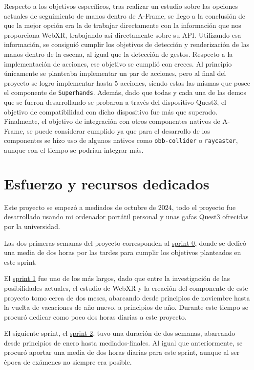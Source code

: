 \documentclass[a4paper, 12pt]{book}
\begin{document}
Respecto a los objetivos específicos, tras realizar un estudio sobre las opciones actuales de seguimiento de manos dentro de A-Frame, se llego a la conclusión de que la mejor opción era la de trabajar directamente con la información que nos proporciona WebXR, trabajando así directamente sobre su API. 
Utilizando esa información, se consiguió cumplir los objetivos de detección y renderización de las manos dentro de la escena, al igual que la detección de gestos. 
Respecto a la implementación de acciones, ese objetivo se cumplió con creces. Al principio únicamente se planteaba implementar un par de acciones, pero al final del proyecto se logro implementar hasta 5 acciones, siendo estas las mismas que posee el componente de \texttt{Superhands}.
Además, dado que todas y cada una de las demos que se fueron desarrollando se probaron a través del dispositivo Quest3, el objetivo de compatibilidad con dicho dispositivo fue más que superado.
Finalmente, el objetivo de integración con otros componentes nativos de A-Frame, se puede considerar cumplido ya que para el desarrollo de los componentes se hizo uso de algunos nativos como \texttt{obb-collider} o \texttt{raycaster}, aunque con el tiempo se podrían integrar más.

\section{Esfuerzo y recursos dedicados}
\label{sec:esfuerzos}

Este proyecto se empezó a mediados de octubre de 2024, todo el proyecto fue desarrollado usando mi ordenador portátil personal y unas gafas Quest3 ofrecidas por la universidad.

Las dos primeras semanas del proyecto corresponden al \hyperref[sec:sprint0]{sprint 0}, donde se dedicó una media de dos horas por las tardes para cumplir los objetivos planteados en este sprint.

El \hyperref[sec:sprint1]{sprint 1} fue uno de los más largos, dado que entre la investigación de las posibilidades actuales, el estudio de WebXR y la creación del componente de este proyecto tomo cerca de dos meses, abarcando desde principios de noviembre hasta la vuelta de vacaciones de año nuevo, a principios de año. Durante este tiempo se procuró dedicar como poco dos horas diarias a este proyecto.

El siguiente sprint, el \hyperref[sec:sprint2]{sprint 2}, tuvo una duración de dos semanas, abarcando desde principios de enero hasta mediados-finales. Al igual que anteriormente, se procuró aportar una media de dos horas diarias para este sprint, aunque al ser época de exámenes no siempre era posible.
\end{document}
